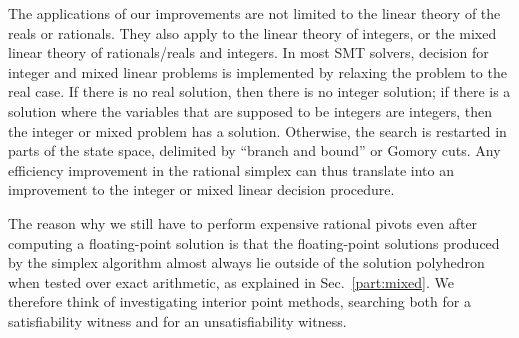 The applications of our improvements are not limited to the linear theory of the reals or rationals. They also apply to the linear theory of integers, or the mixed linear theory of rationals/reals and integers. In most SMT solvers, decision for integer and mixed linear problems is implemented by relaxing the problem to the real case. If there is no real solution, then there is no integer solution; if there is a solution where the variables that are supposed to be integers are integers, then the integer or mixed problem has a solution. Otherwise, the search is restarted in parts of the state space, delimited by ``branch and bound'' or Gomory cuts. Any efficiency improvement in the rational simplex can thus translate into an improvement to the integer or mixed linear decision procedure.

The reason why we still have to perform expensive rational pivots even after computing a floating-point solution is that the floating-point solutions produced by the simplex algorithm almost always lie outside of the solution polyhedron when tested over exact arithmetic, as explained in Sec.~\ref{part:mixed}. We therefore think of investigating interior point methods, searching both for a satisfiability witness and for an unsatisfiability witness.
